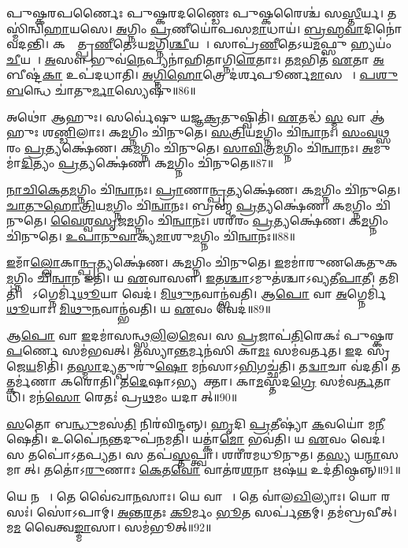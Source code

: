 𑌪𑍁𑌷𑍍𑌕𑌰𑌪𑌰𑍍𑌣𑍈𑌃 𑌪𑍁𑌷𑍍𑌕𑌰𑌦𑌣𑍍𑌡𑍈𑌃 𑌪𑍁𑌷𑍍𑌕𑌰𑍈𑌶𑍍𑌚॑ 𑌸\ul{𑌸𑍍𑌤𑍀}𑌰𑍍𑌯। 𑌤𑌸𑍍𑌮𑌿॑𑌨𑍍𑌵𑌿\-\ul{𑌹𑌾}𑌯𑌸𑍇। 
\ul{𑌅}𑌗𑍍𑌨𑌿𑌂 \ul{𑌪𑍍𑌰}𑌣𑍀𑌯𑍋॑𑌪𑌸\ul{𑌮𑌾}𑌧𑌾𑌯॑। \ul{𑌬𑍍𑌰}\ul{𑌹𑍍𑌮}\ul{𑌵𑌾}𑌦𑌿𑌨𑍋॑ 𑌵𑌦𑌨𑍍𑌤𑌿। 
𑌕𑌸𑍍𑌮𑌾᳚𑌤𑍍𑌪𑍍𑌰\ul{𑌣𑍀}𑌤𑍇\-𑌽𑌯\ul{𑌮}𑌗𑍍𑌨𑌿\ul{𑌶𑍍𑌚𑍀}𑌯𑌤𑍇᳚। 𑌸𑌾𑌪𑍍𑌰॑\ul{𑌣𑍀}𑌤𑍇𑌽𑌯\ul{𑌮}𑌫𑍍𑌸𑍁 𑌹𑍍𑌯𑌯𑌂॑ \ul{𑌚𑍀}𑌯𑌤𑍇᳚। 
\ul{𑌅}𑌸𑍗 𑌭𑍁𑌵॑\ul{𑌨𑍇}𑌪𑍍𑌯𑌨𑌾॑𑌹𑌿𑌤𑌾𑌗𑍍𑌨𑌿\ul{𑌰𑍇}𑌤𑌾𑌃। 𑌤\ul{𑌮}𑌭𑌿𑌤॑ \ul{𑌏}𑌤𑌾 \ul{𑌅}𑌬𑍀𑌷𑍍𑌟॑\ul{𑌕𑌾} 𑌉𑌪॑𑌦𑌧𑌾𑌤𑌿। 
\ul{𑌅}\ul{𑌗𑍍𑌨𑌿}\ul{𑌹𑍋}𑌤𑍍𑌰𑍇 𑌦॑𑌰𑍍𑌶𑌪𑍂𑌰𑍍𑌣\ul{𑌮𑌾}𑌸𑌯𑍋𑌃᳚। \ul{𑌪}\ul{𑌶𑍁}\ul{𑌬}𑌨𑍍𑌧𑍇 𑌚𑌾॑𑌤𑍁\ul{𑌰𑍍𑌮𑌾}𑌸𑍍𑌯𑍇𑌷𑍁॑॥86॥


𑌅𑌥𑍋॑ 𑌆𑌹𑍁𑌃। 𑌸𑌰𑍍𑌵𑍇॑𑌷𑍁 𑌯𑌜𑍍𑌞\ul{𑌕𑍍𑌰}𑌤𑍁𑌷𑍍𑌵𑌿𑌤𑌿॑। 
\ul{𑌏}𑌤𑌦𑍍𑌧॑ \ul{𑌸𑍍𑌮} 𑌵𑌾 𑌆॑𑌹𑍁𑌃 𑌶\ul{𑌣𑍍𑌡𑌿}𑌲𑌾𑌃। 𑌕\ul{𑌮}𑌗𑍍𑌨𑌿𑌂 𑌚𑌿॑𑌨𑍁𑌤𑍇। 
\ul{𑌸}\ul{𑌤𑍍𑌰𑌿}𑌯\ul{𑌮}𑌗𑍍𑌨𑌿𑌂 𑌚𑌿॑\ul{𑌨𑍍𑌵𑌾}𑌨𑌃। \ul{𑌸𑌂}\ul{𑌵}\ul{𑌥𑍍𑌸}𑌰𑌂 \ul{𑌪𑍍𑌰}𑌤𑍍𑌯𑌕𑍍𑌷𑍇॑𑌣। 
𑌕\ul{𑌮}𑌗𑍍𑌨𑌿𑌂 𑌚𑌿॑𑌨𑍁𑌤𑍇। \ul{𑌸𑌾}\ul{𑌵𑌿}𑌤𑍍𑌰\ul{𑌮}𑌗𑍍𑌨𑌿𑌂 𑌚𑌿॑\ul{𑌨𑍍𑌵𑌾}𑌨𑌃। 
\ul{𑌅}𑌮𑍁𑌮𑌾॑\ul{𑌦𑌿}𑌤𑍍𑌯𑌂 \ul{𑌪𑍍𑌰}𑌤𑍍𑌯𑌕𑍍𑌷𑍇॑𑌣। 𑌕\ul{𑌮}𑌗𑍍𑌨𑌿𑌂 𑌚𑌿॑𑌨𑍁𑌤𑍇॥87॥


\ul{𑌨𑌾}\ul{𑌚𑌿}\ul{𑌕𑍇}𑌤\ul{𑌮}𑌗𑍍𑌨𑌿𑌂 𑌚𑌿॑\ul{𑌨𑍍𑌵𑌾}𑌨𑌃। 
\ul{𑌪𑍍𑌰𑌾}𑌣𑌾\ul{𑌨𑍍𑌪𑍍𑌰}𑌤𑍍𑌯𑌕𑍍𑌷𑍇॑𑌣। 𑌕\ul{𑌮}𑌗𑍍𑌨𑌿𑌂 𑌚𑌿॑𑌨𑍁𑌤𑍇। \ul{𑌚𑌾}\ul{𑌤𑍁}\ar{}\ul{𑌹𑍋}\ul{𑌤𑍍𑌰𑌿}𑌯\-\ul{𑌮}𑌗𑍍𑌨𑌿𑌂 𑌚𑌿॑\ul{𑌨𑍍𑌵𑌾}𑌨𑌃। 
𑌬𑍍𑌰𑌹𑍍𑌮॑ \ul{𑌪𑍍𑌰}𑌤𑍍𑌯𑌕𑍍𑌷𑍇॑𑌣। 𑌕\ul{𑌮}𑌗𑍍𑌨𑌿𑌂 𑌚𑌿॑𑌨𑍁𑌤𑍇। \ul{𑌵𑍈}\ul{𑌶𑍍𑌵}\ul{𑌸𑍃}𑌜\ul{𑌮}𑌗𑍍𑌨𑌿𑌂 𑌚𑌿॑\ul{𑌨𑍍𑌵𑌾}𑌨𑌃। 
𑌶𑌰𑍀॑𑌰𑌂 \ul{𑌪𑍍𑌰}𑌤𑍍𑌯𑌕𑍍𑌷𑍇॑𑌣। 𑌕\ul{𑌮}𑌗𑍍𑌨𑌿𑌂 𑌚𑌿॑𑌨𑍁𑌤𑍇। \ul{𑌉}\ul{𑌪𑌾}\ul{𑌨𑍁}\ul{𑌵𑌾}𑌕𑍍𑌯॑\-\ul{𑌮𑌾}𑌶𑍁\ul{𑌮}𑌗𑍍𑌨𑌿𑌂 𑌚𑌿॑\ul{𑌨𑍍𑌵𑌾}𑌨𑌃॥88॥


\ul{𑌇}𑌮𑌾𑌁\ul{𑌲𑍍𑌲𑍋}𑌕𑌾\ul{𑌨𑍍𑌪𑍍𑌰}𑌤𑍍𑌯𑌕𑍍𑌷𑍇॑𑌣। 𑌕\ul{𑌮}𑌗𑍍𑌨𑌿𑌂 𑌚𑌿॑𑌨𑍁𑌤𑍇। 
\ul{𑌇}𑌮𑌮𑌾॑𑌰𑍁𑌣𑌕𑍇𑌤𑍁𑌕\ul{𑌮}𑌗𑍍𑌨𑌿𑌂 𑌚𑌿॑\ul{𑌨𑍍𑌵𑌾}𑌨 𑌇𑌤𑌿॑। 𑌯 \ul{𑌏}𑌵𑌾𑌸𑍗। 
\ul{𑌇}𑌤\ul{𑌶𑍍𑌚𑌾}𑌽𑌮𑍁𑌤॑𑌶𑍍𑌚𑌾𑌽𑌵𑍍𑌯𑌤𑍀\ul{𑌪𑌾}𑌤𑍀। 𑌤𑌮𑌿𑌤𑌿॑। 
𑌯𑍋᳚𑌽𑌗𑍍𑌨𑍇𑌰𑍍𑌮𑌿॑\ul{𑌥𑍂}𑌯𑌾 𑌵𑍇𑌦॑। \ul{𑌮𑌿}\ul{𑌥𑍁}\ul{𑌨}𑌵𑌾𑌨𑍍𑌭॑𑌵𑌤𑌿। 
𑌆\ul{𑌪𑍋} 𑌵𑌾 \ul{𑌅}𑌗𑍍𑌨𑍇𑌰𑍍𑌮𑌿॑\ul{𑌥𑍂}𑌯𑌾𑌃। \ul{𑌮𑌿}\ul{𑌥𑍁}\ul{𑌨}𑌵𑌾𑌨𑍍𑌭॑𑌵𑌤𑌿। 𑌯 \ul{𑌏}𑌵𑌂 𑌵𑍇𑌦॑॥89॥\anuvakamend


𑌆\ul{𑌪𑍋} 𑌵𑌾 \ul{𑌇}𑌦𑌮𑌾॑𑌸𑌨𑍍𑌥𑍍𑌸\ul{𑌲𑌿}𑌲\ul{𑌮𑍇}𑌵। 𑌸 \ul{𑌪𑍍𑌰}𑌜𑌾𑌪॑\ul{𑌤𑌿}𑌰𑍇𑌕𑌃॑ 𑌪𑍁𑌷𑍍𑌕𑌰\ul{𑌪}𑌰𑍍𑌣𑍇 𑌸𑌮॑𑌭𑌵𑌤𑍍‌। 
𑌤𑌸𑍍𑌯𑌾\ul{𑌨𑍍𑌤}𑌰𑍍𑌮𑌨॑𑌸𑌿 𑌕𑌾\ul{𑌮𑌃} 𑌸𑌮॑𑌵𑌰𑍍𑌤𑌤। \ul{𑌇}𑌦 𑌸𑍃॑𑌜𑍇\ul{𑌯}𑌮𑌿𑌤𑌿॑। 
𑌤\ul{𑌸𑍍𑌮𑌾}𑌦𑍍𑌯𑌤𑍍𑌪𑍁𑌰𑍁॑\ul{𑌷𑍋} 𑌮𑌨॑𑌸𑌾𑌽\ul{𑌭𑌿}𑌗𑌚𑍍𑌛॑𑌤𑌿। 𑌤\ul{𑌦𑍍𑌵𑌾}𑌚𑌾 𑌵॑𑌦𑌤𑌿। 
𑌤𑌤𑍍𑌕𑌰𑍍𑌮॑𑌣𑌾 𑌕𑌰𑍋𑌤𑌿। 𑌤\ul{𑌦𑍇}𑌷𑌾𑌽𑌭𑍍𑌯𑌨𑍂᳚𑌕𑍍𑌤𑌾। 
𑌕𑌾\ul{𑌮}𑌸𑍍𑌤𑌦\ul{𑌗𑍍𑌰𑍇} 𑌸𑌮॑𑌵\ul{𑌰𑍍𑌤}𑌤𑌾𑌧𑌿॑। 𑌮𑌨॑\ul{𑌸𑍋} 𑌰𑍇𑌤𑌃॑ 𑌪𑍍𑌰\ul{𑌥}𑌮𑌂 𑌯𑌦𑌾𑌸𑍀᳚𑌤𑍍‌॥90॥


\ul{𑌸}𑌤𑍋 𑌬\ul{𑌨𑍍𑌧𑍁}𑌮𑌸॑\ul{𑌤𑌿} 𑌨𑌿𑌰॑𑌵𑌿𑌨𑍍𑌦𑌨𑍍𑌨𑍍‌। \ul{𑌹𑍃}𑌦𑌿 \ul{𑌪𑍍𑌰}𑌤𑍀𑌷𑍍𑌯𑌾॑ \ul{𑌕}𑌵𑌯𑍋॑ 𑌮\ul{𑌨𑍀}𑌷𑍇𑌤𑌿॑। 
𑌉𑌪𑍈॑\ul{𑌨}𑌨𑍍𑌤𑌦𑍁𑌪॑𑌨𑌮𑌤𑌿। 𑌯𑌤𑍍𑌕𑌾॑\ul{𑌮𑍋} 𑌭𑌵॑𑌤𑌿। 𑌯 \ul{𑌏}𑌵𑌂 𑌵𑍇𑌦॑। 
𑌸 𑌤𑌪𑍋॑𑌽𑌤𑌪𑍍𑌯𑌤। 𑌸 𑌤𑌪॑\ul{𑌸𑍍𑌤}𑌪𑍍𑌤𑍍𑌵𑌾। 𑌶𑌰𑍀॑𑌰𑌮𑌧𑍂𑌨𑍁𑌤। 𑌤\ul{𑌸𑍍𑌯} 𑌯\ul{𑌨𑍍𑌮𑌾}\ul{}𑌸𑌮𑌾𑌸𑍀᳚𑌤𑍍‌। 
𑌤𑌤𑍋॑𑌽\ul{𑌰𑍁}𑌣𑌾𑌃 \ul{𑌕𑍇}𑌤\ul{𑌵𑍋} 𑌵𑌾𑌤॑𑌰\ul{𑌶}𑌨𑌾 𑌋𑌷॑\ul{𑌯} 𑌉𑌦॑𑌤𑌿𑌷𑍍𑌠𑌨𑍍𑌨𑍍॥91॥


𑌯𑍇 𑌨𑌖𑌾𑌃᳚। 𑌤𑍇 𑌵𑍈॑𑌖𑌾\ul{𑌨}𑌸𑌾𑌃। 𑌯𑍇 𑌵𑌾𑌲𑌾𑌃᳚। 𑌤𑍇 𑌵𑌾॑𑌲\ul{𑌖𑌿}𑌲𑍍𑌯𑌾𑌃। 
𑌯𑍋 𑌰𑌸𑌃॑। 𑌸𑍋॑𑌽𑌪𑌾𑌮𑍍‌। \ul{𑌅}\ul{𑌨𑍍𑌤}\ul{𑌰}𑌤𑌃 \ul{𑌕𑍂}𑌰𑍍𑌮𑌂 \ul{𑌭𑍂}𑌤 𑌸𑌰𑍍𑌪॑𑌨𑍍𑌤𑌮𑍍‌। 
𑌤𑌮॑𑌬𑍍𑌰𑌵𑍀𑌤𑍍‌। 𑌮\ul{𑌮} 𑌵𑍈𑌤𑍍𑌵\ul{𑌙𑍍𑌮𑌾}\ul{}𑌸𑌾। 𑌸𑌮॑𑌭𑍂𑌤𑍍‌॥92॥


